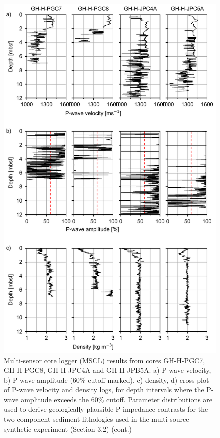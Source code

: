 \documentclass[se,manuscript]{copernicus}
\begin{document}
\begin{figure}
    \includegraphics{figures/si_fig01_pg_1.pdf}
    \caption{Multi-sensor core logger (MSCL) results from cores GH-H-PGC7, GH-H-PGC8, GH-H-JPC4A and GH-H-JPB5A. a) P-wave velocity, b) P-wave amplitude (60\% cutoff marked), c) density, d) cross-plot of P-wave velocity and density logs, for depth intervals where the P-wave amplitude exceeds the 60\% cutoff. Parameter distributions are used to derive geologically plausible P-impedance contrasts for the two component sediment lithologies used in the multi-source synthetic experiment (Section 3.2) (cont.)}
    \label{fig:mscl}
\end{figure}
\end{document}
